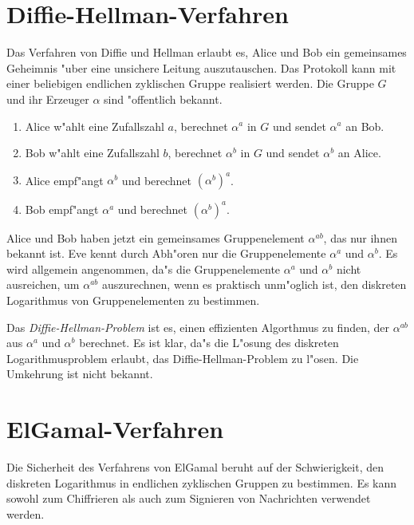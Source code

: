 \section{Diffie-Hellman-Verfahren}
  Das Verfahren von Diffie und Hellman erlaubt es, Alice und Bob ein gemeinsames
  Geheimnis "uber eine unsichere Leitung auszutauschen. Das Protokoll kann mit einer
  beliebigen endlichen zyklischen Gruppe realisiert werden. Die Gruppe $G$ und ihr
  Erzeuger $\alpha$ sind "offentlich bekannt.
  \begin{enumerate}
    \item Alice w"ahlt eine Zufallszahl $a$, berechnet $\alpha^a$ in $G$ und sendet
      $\alpha^a$ an Bob.
    \item Bob w"ahlt eine Zufallszahl $b$, berechnet $\alpha^b$ in $G$ und sendet
      $\alpha^b$ an Alice.
    \item Alice empf"angt $\alpha^b$ und berechnet $(\alpha^b)^a$.
    \item Bob empf"angt $\alpha^a$ und berechnet $(\alpha^b)^a$.
  \end{enumerate}
  Alice und Bob haben jetzt ein gemeinsames Gruppenelement $\alpha^{ab}$, das nur ihnen
  bekannt ist. Eve kennt durch Abh"oren nur die Gruppenelemente $\alpha^a$ und 
  $\alpha^b$. Es wird allgemein angenommen, da"s die Gruppenelemente $\alpha^a$ und
  $\alpha^b$ nicht ausreichen, um $\alpha^{ab}$ auszurechnen, wenn es praktisch
  unm"oglich ist, den diskreten Logarithmus von Gruppenelementen zu bestimmen.
  
  Das {\em Diffie-Hellman-Problem} ist es, einen effizienten Algorthmus zu finden,
  der $\alpha^{ab}$ aus $\alpha^a$ und $\alpha^b$ berechnet. Es ist klar, da"s die
  L"osung des diskreten Logarithmusproblem erlaubt, das Diffie-Hellman-Problem zu
  l"osen. Die Umkehrung ist nicht bekannt.

  \section{ElGamal-Verfahren}
     Die Sicherheit des Verfahrens von ElGamal
     beruht auf der Schwierigkeit, den diskreten Logarithmus 
     in endlichen zyklischen Gruppen zu bestimmen.
     Es kann sowohl zum Chiffrieren als auch zum Signieren 
     von Nachrichten verwendet werden. 

